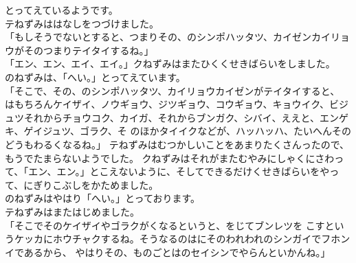\documentclass[
a4paper,
10pt,
book]
{tarticle}
\begin{document}
とってえているようです。\\
\indent テねずみははなしをつづけました。\\
「もしそうでないとすると、つまりその、のシンポハッタツ、カイゼンカイリョウがそのつまりテイタイするね。」\\
「エン、エン、エイ、エイ。」クねずみはまたひくくせきばらいをしました。\\
\indent {}のねずみは、「へい。」とってえています。\\
「そこで、その、のシンポハッタツ、カイリョウカイゼンがテイタイすると、
はもちろんケイザイ、ノウギョウ、ジツギョウ、コウギョウ、キョウイク、ビジュツそれからチョウコク、カイガ、それからブンガク、シバイ、ええと、エンゲキ、ゲイジュツ、ゴラク、そ
のほかタイイクなどが、ハッハッハ、たいへんそのどうもわるくなるね。」
テねずみはむつかしいことをあまりたくさんったので、もうでたまらないようでした。
クねずみはそれがまたむやみにしゃくにさわって、「エン、エン。」とこえないように、そしてできるだけくせきばらいをやって、にぎりこぶしをかためました。\\
\indent {}のねずみはやはり「へい。」とっております。\\
\indent テねずみはまたはじめました。\\
「そこでそのケイザイやゴラクがくなるというと、をじてブンレツを
こすというケッカにホウチャクするね。そうなるのはにそのわれわれのシンガイでフホンイであるから、
やはりその、ものごとはのセイシンでやらんといかんね。」
\end{document}
